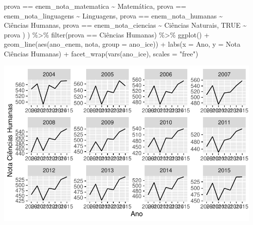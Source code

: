 \documentclass[
  letterpaper,
  DIV=11,
  numbers=noendperiod]{scrartcl}
\newenvironment{Shaded}{\begin{snugshade}}{\end{snugshade}}
\newcommand{\AttributeTok}[1]{\textcolor[rgb]{0.40,0.45,0.13}{#1}}
\newcommand{\ConstantTok}[1]{\textcolor[rgb]{0.56,0.35,0.01}{#1}}
\newcommand{\FunctionTok}[1]{\textcolor[rgb]{0.28,0.35,0.67}{#1}}
\newcommand{\NormalTok}[1]{\textcolor[rgb]{0.00,0.23,0.31}{#1}}
\newcommand{\SpecialCharTok}[1]{\textcolor[rgb]{0.37,0.37,0.37}{#1}}
\newcommand{\StringTok}[1]{\textcolor[rgb]{0.13,0.47,0.30}{#1}}
\begin{document}
\begin{Shaded}
\begin{Highlighting}[]
\NormalTok{      prova }\SpecialCharTok{==} \StringTok{\textquotesingle{}enem\_nota\_matematica\textquotesingle{}} \SpecialCharTok{\textasciitilde{}} \StringTok{\textquotesingle{}Matemática\textquotesingle{}}\NormalTok{,}
\NormalTok{      prova }\SpecialCharTok{==} \StringTok{\textquotesingle{}enem\_nota\_linguagens\textquotesingle{}} \SpecialCharTok{\textasciitilde{}} \StringTok{\textquotesingle{}Linguagens\textquotesingle{}}\NormalTok{,}
\NormalTok{      prova }\SpecialCharTok{==} \StringTok{\textquotesingle{}enem\_nota\_humanas\textquotesingle{}} \SpecialCharTok{\textasciitilde{}} \StringTok{\textquotesingle{}Ciências Humanas\textquotesingle{}}\NormalTok{,}
\NormalTok{      prova }\SpecialCharTok{==} \StringTok{\textquotesingle{}enem\_nota\_ciencias\textquotesingle{}} \SpecialCharTok{\textasciitilde{}} \StringTok{\textquotesingle{}Ciências Naturais\textquotesingle{}}\NormalTok{,}
      \ConstantTok{TRUE} \SpecialCharTok{\textasciitilde{}}\NormalTok{ prova}
\NormalTok{    )}
\NormalTok{  ) }\SpecialCharTok{\%\textgreater{}\%}
  \FunctionTok{filter}\NormalTok{(prova }\SpecialCharTok{==} \StringTok{\textquotesingle{}Ciências Humanas\textquotesingle{}}\NormalTok{) }\SpecialCharTok{\%\textgreater{}\%} 
  \FunctionTok{ggplot}\NormalTok{() }\SpecialCharTok{+}
  \FunctionTok{geom\_line}\NormalTok{(}\FunctionTok{aes}\NormalTok{(ano\_enem, nota, }\AttributeTok{group =}\NormalTok{ ano\_ice)) }\SpecialCharTok{+}
  \FunctionTok{labs}\NormalTok{(}\AttributeTok{x =} \StringTok{\textquotesingle{}Ano\textquotesingle{}}\NormalTok{, }\AttributeTok{y =} \StringTok{\textquotesingle{}Nota Ciências Humanas\textquotesingle{}}\NormalTok{) }\SpecialCharTok{+}
  \FunctionTok{facet\_wrap}\NormalTok{(}\FunctionTok{vars}\NormalTok{(ano\_ice), }\AttributeTok{scales =} \StringTok{"free"}\NormalTok{)}
\end{Highlighting}
\end{Shaded}

\includegraphics{script_files/figure-latex/unnamed-chunk-11-5.pdf}
\end{document}

